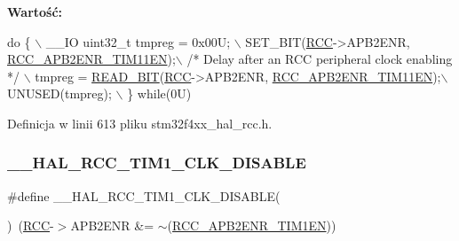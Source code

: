 {\bfseries Wartość\+:}
\begin{DoxyCode}
\textcolor{keywordflow}{do} \{ \(\backslash\)
                                        \_\_IO uint32\_t tmpreg = 0x00U; \(\backslash\)
                                        SET\_BIT(\hyperlink{group___peripheral__declaration_ga74944438a086975793d26ae48d5882d4}{RCC}->APB2ENR, 
      \hyperlink{group___peripheral___registers___bits___definition_gab1d2aeebc8ccf4e2ee18f4d924a35188}{RCC\_APB2ENR\_TIM11EN});\(\backslash\)
                                        \textcolor{comment}{/* Delay after an RCC peripheral clock enabling */} \(\backslash\)
                                        tmpreg = \hyperlink{group___exported__macro_ga822bb1bb9710d5f2fa6396b84e583c33}{READ\_BIT}(\hyperlink{group___peripheral__declaration_ga74944438a086975793d26ae48d5882d4}{RCC}->APB2ENR, 
      \hyperlink{group___peripheral___registers___bits___definition_gab1d2aeebc8ccf4e2ee18f4d924a35188}{RCC\_APB2ENR\_TIM11EN});\(\backslash\)
                                        UNUSED(tmpreg); \(\backslash\)
                                          \} \textcolor{keywordflow}{while}(0U)
\end{DoxyCode}


Definicja w linii 613 pliku stm32f4xx\+\_\+hal\+\_\+rcc.\+h.

\mbox{\label{group___r_c_c___a_p_b2___clock___enable___disable_gaa9eacfb8ee244074ec63dae0b9f621c2}} 
\subsubsection{\texorpdfstring{\+\_\+\+\_\+\+H\+A\+L\+\_\+\+R\+C\+C\+\_\+\+T\+I\+M1\+\_\+\+C\+L\+K\+\_\+\+D\+I\+S\+A\+B\+LE}{\_\_HAL\_RCC\_TIM1\_CLK\_DISABLE}}
{\footnotesize\ttfamily \#define \+\_\+\+\_\+\+H\+A\+L\+\_\+\+R\+C\+C\+\_\+\+T\+I\+M1\+\_\+\+C\+L\+K\+\_\+\+D\+I\+S\+A\+B\+LE(\begin{DoxyParamCaption}{ }\end{DoxyParamCaption})~(\hyperlink{group___peripheral__declaration_ga74944438a086975793d26ae48d5882d4}{R\+CC}-\/$>$A\+P\+B2\+E\+NR \&= $\sim$(\hyperlink{group___peripheral___registers___bits___definition_ga25852ad4ebc09edc724814de967816bc}{R\+C\+C\+\_\+\+A\+P\+B2\+E\+N\+R\+\_\+\+T\+I\+M1\+EN}))}




